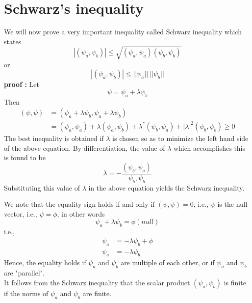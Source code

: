 \section{Schwarz's inequality}
We will now prove a very important inequality called Schwarz inequality which states
\begin{equation}\label{eqn:2.56}
|(\psi_a, \psi_b)| \leq \sqrt{(\psi_a, \psi_a)(\psi_b, \psi_b)}
\end{equation}
or
\begin{equation}\label{eqn:2.57}
|(\psi_a, \psi_b)| \leq ||\psi_a ||\ ||\psi_b||
\end{equation}
\textbf{proof : }
Let
\begin{equation}\label{eqn:2.58}
\psi = \psi_a + \lambda \psi_b
\end{equation}
Then
\begin{eqnarray}\label{eqn:2.59-2.60}
	(\psi, \psi) &= (\psi_a + \lambda \psi_b, \psi_a + \lambda \psi_b) \\
	&= (\psi_a, \psi_a) + \lambda (\psi_a, \psi_b) + \lambda^* (\psi_b, \psi_a) + |\lambda|^2 (\psi_b, \psi_b) \geq 0
\end{eqnarray}
The best inequality is obtained if $\lambda$ is chosen so as to minimize the left hand side of the above equation. By differentiation, the value of $\lambda$ which accomplishes this is found to be
\begin{equation}\label{eqn:2.61}
\lambda = - \frac{(\psi_b, \psi_a)}{\psi_b, \psi_b}
\end{equation}
Substituting this value of $\lambda$ in the above equation yields the Schwarz inequality.


We note that the equality sign holds if and only if $(\psi, \psi) = 0$, i.e., $\psi$ is the null vector, i.e., $\psi = \phi$, in other words
\begin{equation}\label{eqn:2.62}
\psi_a + \lambda \psi_b = \phi (null)
\end{equation}
i.e.,
\begin{eqnarray}\label{eqn:2.63-2.64}
	\psi_a &= - \lambda \psi_b + \phi \\
	\psi_a &= -\lambda \psi_b
\end{eqnarray}
Hence, the equality holds if $\psi_a$ and $\psi_b$ are multiple of each other, or if $\psi_a$ and $\psi_b$ are "parallel".\\
It follows from the Schwarz inequality that the scalar product $(\psi_a, \psi_b)$ is finite if the norms of $\psi_a$ and $\psi_b$ are finite.



